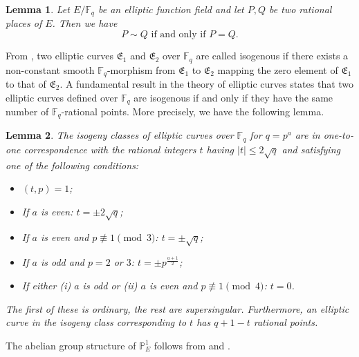 \documentclass[journal,12pt,onecolumn]{IEEEtran}
\newtheorem{lemma}{Lemma}
\begin{document}
\begin{lemma}\label{P=Q}
    Let \( E/\mathbb{F}_q \) be an elliptic function field and let \( P, Q \) be two rational places of \( E \). Then we have  
    \[
        P \sim Q \text{ if and only if } P = Q.
    \]
\end{lemma}

From \cite{silvermanArithmeticEllipticCurves2009}, two elliptic curves $\mathfrak{E}_1$ and $\mathfrak{E}_2$ over $\mathbb{F}_q$ are called isogenous if there exists a non-constant smooth $\mathbb{F}_q$-morphism from $\mathfrak{E}_1$ to $\mathfrak{E}_2$ mapping the zero element of $\mathfrak{E}_1$ to that of $\mathfrak{E}_2$. A fundamental result in the theory of elliptic curves states that two elliptic curves defined over $\mathbb{F}_q$ are isogenous if and only if they have the same number of $\mathbb{F}_q$-rational points. More precisely, we have the following lemma\cite{waterhouse_abelian_1969}.

\begin{lemma}\label{iso}
    The isogeny classes of elliptic curves over \( \mathbb{F}_q \) for \( q = p^a \) are in one-to-one correspondence with the rational integers \( t \) having \( |t| \leq 2\sqrt{q} \) and satisfying one of the following conditions:
    \begin{itemize}
        \item[(i)] \( (t, p) = 1 \);
        \item[(ii)] If \( a \) is even: \( t = \pm 2\sqrt{q} \);
        \item[(iii)] If \( a \) is even and \( p \not\equiv 1 \pmod{3} \): \( t = \pm \sqrt{q} \);
        \item[(iv)] If \( a \) is odd and \( p = 2 \) or \( 3 \): \( t = \pm p^{\frac{a+1}{2}} \);
        \item[(v)] If either (i) \( a \) is odd or (ii) \( a \) is even and \( p \not\equiv 1 \pmod{4} \): \( t = 0 \).
    \end{itemize}
    The first of these is ordinary, the rest are supersingular. Furthermore, an elliptic curve in the isogeny class corresponding to \( t \) has \( q+1-t \) rational points.
\end{lemma}

The abelian group structure of $\mathbb{P}_E^1$ follows from \cite[Thm. 3]{Ruck1987301} and \cite[Thm. 9.97]{hirschfeld2008algebraic}.
\end{document}
